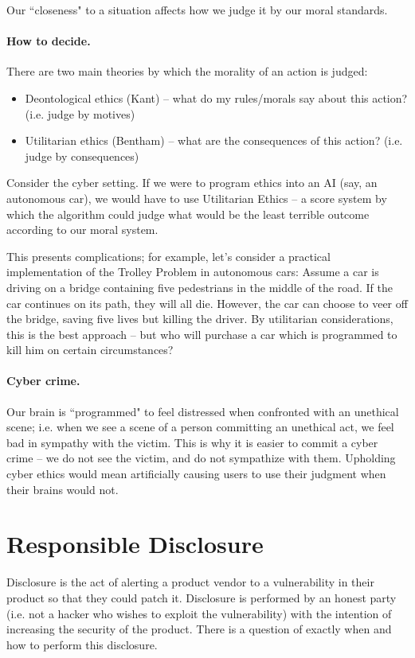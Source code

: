 Our ``closeness" to a situation affects how we judge it by our moral standards.

\paragraph{How to decide.} There are two main theories by which the morality of an action is judged:
\begin{itemize}
    \item Deontological ethics (Kant) -- what do my rules/morals say about this action? (i.e. judge by motives)
    \item Utilitarian ethics (Bentham) -- what are the consequences of this action? (i.e. judge by consequences)
\end{itemize}

Consider the cyber setting. If we were to program ethics into an AI (say, an autonomous car), we would have to use Utilitarian Ethics -- a score system by which the algorithm could judge what would be the least terrible outcome according to our moral system.

This presents complications; for example, let's consider a practical implementation of the Trolley Problem in autonomous cars:
Assume a car is driving on a bridge containing five pedestrians in the middle of the road. If the car continues on its path, they will all die. However, the car can choose to veer off the bridge, saving five lives but killing the driver. By utilitarian considerations, this is the best approach – but who will purchase a car which is programmed to kill him on certain circumstances?

\paragraph{Cyber crime.} Our brain is ``programmed" to feel distressed when confronted with an unethical scene; i.e. when we see a scene of a person committing an unethical act, we feel bad in sympathy with the victim. This is why it is easier to commit a cyber crime -- we do not see the victim, and do not sympathize with them. Upholding cyber ethics would mean artificially causing users to use their judgment when their brains would not.

\section{Responsible Disclosure}
Disclosure is the act of alerting a product vendor to a vulnerability in their product so that they could patch it. Disclosure is performed by an honest party (i.e. not a hacker who wishes to exploit the vulnerability) with the intention of increasing the security of the product. There is a question of exactly when and how to perform this disclosure.

